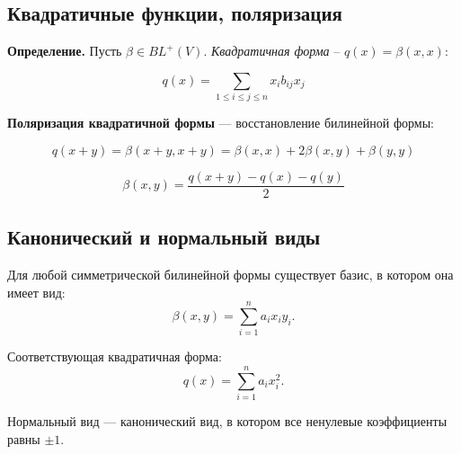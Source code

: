\documentclass[12pt]{article}
\begin{document}
\subsection{Квадратичные функции, поляризация}

\textbf{Определение.} Пусть $\beta \in BL^+(V).$ \textit{Квадратичная форма} – $q(x)=\beta(x,x)$:

$$
q(x) =\sum_{1 \leq i \leq j \leq n}{x_i b_{ij}x_j}
$$

\textbf{Поляризация квадратичной формы} — восстановление билинейной формы:

$$
q(x + y) = \beta(x + y, x + y)
         = \beta(x, x) + 2\beta(x, y) + \beta(y, y)
$$

$$
\beta(x, y) = \frac{q(x + y) - q(x) - q(y)}{2}
$$

\subsection{Канонический и нормальный виды}

Для любой симметрической билинейной формы существует базис, в котором она имеет вид:
$$
\beta(x, y) = \sum_{i=1}^n a_i x_i y_i.
$$

Соответствующая квадратичная форма:
$$
q(x) = \sum_{i=1}^n a_i x_i^2.
$$

Нормальный вид — канонический вид, в котором все ненулевые коэффициенты равны $\pm 1$.
\end{document}

